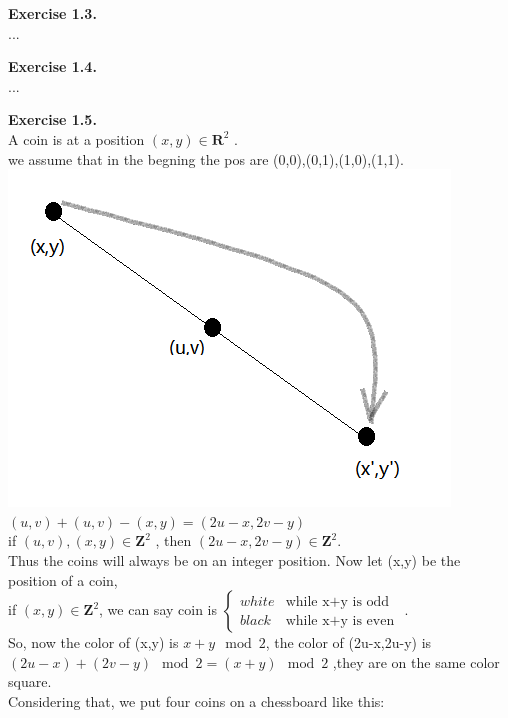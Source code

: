 \documentclass{article}
\begin{document}
\begin{flushleft}
\textbf{Exercise 1.3.} \\
...

\textbf{Exercise 1.4.} \\
...

\textbf{Exercise 1.5.} \\
A coin is at a position $(x,y)\in\mathbf{R}^2$ .\\
we assume that in the begning the pos are (0,0),(0,1),(1,0),(1,1).\\
\includegraphics[scale=1]{1_5_1.png}\\
$(u,v)+(u,v)-(x,y)=(2u-x,2v-y)$\\
if $(u,v),(x,y)\in\mathbf{Z}^2$ , then $(2u-x,2v-y)\in\mathbf{Z}^2$.\\
Thus the coins will always be on an integer position.
Now let (x,y) be the position of a coin,\\
if $(x,y)\in\mathbf{Z}^2$, we can say coin is
$
\left\{\begin{array}{ll}
white & \textrm{while x+y is odd}\\
black & \textrm{while x+y is even}
\end{array} \right.
$
.\\
So, now the color of (x,y) is $x+y\mod2$, the color of (2u-x,2u-y) is $(2u-x)+(2v-y)\mod2=(x+y)\mod2$
,they are on the same color square.\\
Considering that, we put four coins on a chessboard like this:

\end{flushleft}
\end{document}
